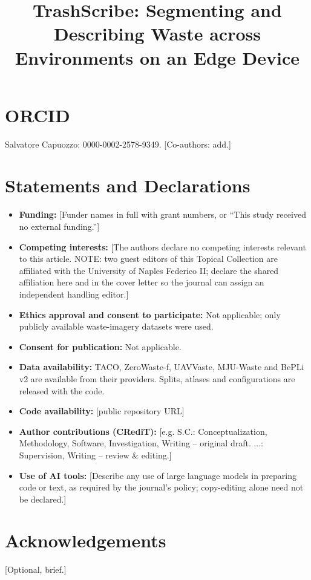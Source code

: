 \documentclass[pdflatex,sn-basic,Numbered]{sn-jnl}
\begin{document}
\title[TrashScribe]{TrashScribe: Segmenting and Describing Waste across Environments on an Edge Device}

\author*[1]{ }
\author[1]{\fnm{[Co-author]} \sur{[Name]}}
\author[1]{\fnm{[Co-author]} \sur{[Name]}}



\maketitle

\section*{ORCID}
Salvatore Capuozzo: 0000-0002-2578-9349. [Co-authors: add.]

\section*{Statements and Declarations}
\begin{itemize}
\item \textbf{Funding:} [Funder names in full with grant numbers, or ``This study received no external funding.'']
\item \textbf{Competing interests:} [The authors declare no competing interests relevant to this article. NOTE: two guest editors of this Topical Collection are affiliated with the University of Naples Federico II; declare the shared affiliation here and in the cover letter so the journal can assign an independent handling editor.]
\item \textbf{Ethics approval and consent to participate:} Not applicable; only publicly available waste-imagery datasets were used.
\item \textbf{Consent for publication:} Not applicable.
\item \textbf{Data availability:} TACO, ZeroWaste-f, UAVVaste, MJU-Waste and BePLi v2 are available from their providers. Splits, atlases and configurations are released with the code.
\item \textbf{Code availability:} [public repository URL]
\item \textbf{Author contributions (CRediT):} [e.g. S.C.: Conceptualization, Methodology, Software, Investigation, Writing -- original draft. ...: Supervision, Writing -- review \& editing.]
\item \textbf{Use of AI tools:} [Describe any use of large language models in preparing code or text, as required by the journal's policy; copy-editing alone need not be declared.]
\end{itemize}

\section*{Acknowledgements}
[Optional, brief.]
\end{document}
